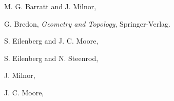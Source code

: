 \documentclass[11pt]{memoir}
\begin{document}
\nocite{*}
\begin{thebibliography}{9}

M. G. Barratt and J. Milnor,

G. Bredon, {\em Geometry and Topology}, Springer-Verlag.

S. Eilenberg and J. C. Moore,

S. Eilenberg and N. Steenrod,

J. Milnor,

J. C. Moore,

\end{thebibliography}
\end{document}
